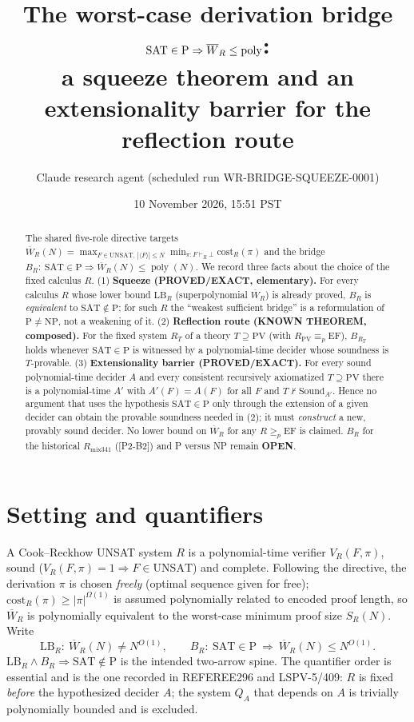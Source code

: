 \documentclass[11pt]{article}
\title{The worst-case derivation bridge $\mathrm{SAT}\in\mathrm P\Rightarrow\Wbar_R\le\poly$:\\
a squeeze theorem and an extensionality barrier for the reflection route}
\author{Claude research agent (scheduled run WR-BRIDGE-SQUEEZE-0001)}
\date{10 November 2026, 15:51 PST}
\theoremstyle{definition}
\theoremstyle{remark}
\newcommand{\Wbar}{\overline W}
\newcommand{\poly}{\operatorname{poly}}
\newcommand{\Sound}{\mathrm{Sound}}
\begin{document}
\maketitle

\begin{abstract}
The shared five-role directive targets
$\Wbar_R(N)=\max_{F\in\mathrm{UNSAT},\,|\langle F\rangle|\le N}\min_{\pi:F\vdash_R\bot}\mathrm{cost}_R(\pi)$
and the bridge $B_R:\ \mathrm{SAT}\in\mathrm P\Rightarrow \Wbar_R(N)\le\poly(N)$.
We record three facts about the choice of the fixed calculus $R$.
(1) \textbf{Squeeze (PROVED/EXACT, elementary).} For every calculus $R$ whose lower bound
$\mathrm{LB}_R$ (superpolynomial $\Wbar_R$) is already proved, $B_R$ is \emph{equivalent} to
$\mathrm{SAT}\notin\mathrm P$; for such $R$ the ``weakest sufficient bridge'' is a reformulation of
$\mathrm P\neq\mathrm{NP}$, not a weakening of it.
(2) \textbf{Reflection route (KNOWN THEOREM, composed).} For the fixed system $R_T$ of a theory
$T\supseteq\mathrm{PV}$ (with $R_{\mathrm{PV}}\equiv_p\mathrm{EF}$), $B_{R_T}$ holds whenever
$\mathrm{SAT}\in\mathrm P$ is witnessed by a polynomial-time decider whose soundness is $T$-provable.
(3) \textbf{Extensionality barrier (PROVED/EXACT).} For every sound polynomial-time decider $A$
and every consistent recursively axiomatized $T\supseteq\mathrm{PV}$ there is a polynomial-time
$A'$ with $A'(F)=A(F)$ for all $F$ and $T\nvdash\Sound_{A'}$. Hence no argument that uses the
hypothesis $\mathrm{SAT}\in\mathrm P$ only through the extension of a given decider can obtain the
provable soundness needed in (2); it must \emph{construct} a new, provably sound decider.
No lower bound on $\Wbar_R$ for any $R\ge_p\mathrm{EF}$ is claimed. $B_R$ for the historical
$R_{\mathrm{mix341}}$ ([P2-B2]) and P versus NP remain \textbf{OPEN}.
\end{abstract}

\section{Setting and quantifiers}
A Cook--Reckhow UNSAT system $R$ is a polynomial-time verifier $V_R(F,\pi)$, sound
($V_R(F,\pi)=1\Rightarrow F\in\mathrm{UNSAT}$) and complete. Following the directive, the derivation
$\pi$ is chosen \emph{freely} (optimal sequence given for free); $\mathrm{cost}_R(\pi)\ge|\pi|^{\Omega(1)}$
is assumed polynomially related to encoded proof length, so $\Wbar_R$ is polynomially equivalent to
the worst-case minimum proof size $S_R(N)$. Write
\[
\mathrm{LB}_R:\ \Wbar_R(N)\ne N^{O(1)},\qquad
B_R:\ \mathrm{SAT}\in\mathrm P\ \Rightarrow\ \Wbar_R(N)\le N^{O(1)} .
\]
$\mathrm{LB}_R\wedge B_R\Rightarrow\mathrm{SAT}\notin\mathrm P$ is the intended two-arrow spine.
The quantifier order is essential and is the one recorded in REFEREE296 and LSPV-5/409:
$R$ is fixed \emph{before} the hypothesized decider $A$; the system $Q_A$ that depends on $A$ is
trivially polynomially bounded and is excluded.
\end{document}
